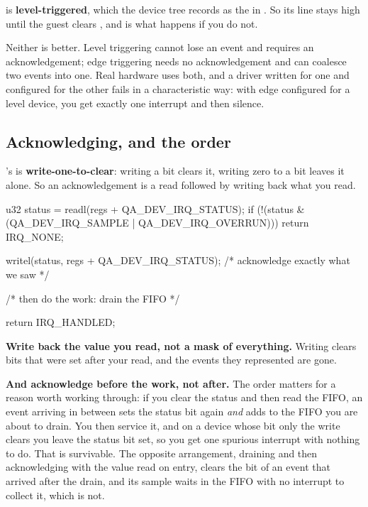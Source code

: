 \noindent {} is \textbf{level-triggered}, which the device tree records as the 
in . So its line stays high until the guest clears ,
and  is what happens if you do not.

Neither is better. Level triggering cannot lose an event and requires an acknowledgement; edge
triggering needs no acknowledgement and can coalesce two events into one. Real hardware uses both,
and a driver written for one and configured for the other fails in a characteristic way: with edge
configured for a level device, you get exactly one interrupt and then silence.

\subsection{Acknowledging, and the order}
\label{c8:app:a5}

's  is \textbf{write-one-to-clear}: writing a bit clears it, writing
zero to a bit leaves it alone. So an acknowledgement is a read followed by writing back what you
read.

\begin{ccode}
u32 status = readl(regs + QA_DEV_IRQ_STATUS);
if (!(status & (QA_DEV_IRQ_SAMPLE | QA_DEV_IRQ_OVERRUN)))
        return IRQ_NONE;

writel(status, regs + QA_DEV_IRQ_STATUS);  /* acknowledge exactly what we saw */

/* then do the work: drain the FIFO */

return IRQ_HANDLED;
\end{ccode}

\noindent \textbf{Write back the value you read, not a mask of everything.} Writing
 clears bits that were set after your read, and the events they represented are
gone.

\textbf{And acknowledge before the work, not after.} The order matters for a reason worth working
through: if you clear the status and then read the FIFO, an event arriving in between sets the
status bit again \emph{and} adds to the FIFO you are about to drain. You then service it, and on a
device whose bit only the write clears you leave the status bit set, so you get one spurious
interrupt with nothing to do. That is survivable. The opposite arrangement, draining and then
acknowledging with the value read on entry, clears the bit of an event that arrived after the
drain, and its sample waits in the FIFO with no interrupt to collect it, which is not.

